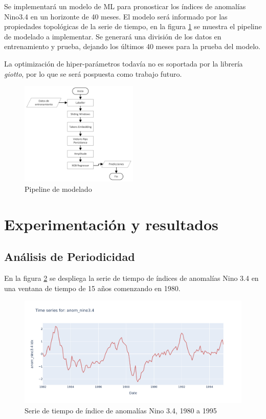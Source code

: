 \documentclass{article}
\begin{document}
            Se implementará un modelo de ML para pronosticar los índices de anomalías Nino3.4 en un horizonte de 40 meses. El modelo será informado por las propiedades topológicas de la serie de tiempo, en la figura \ref{fig:model_pipeline} se muestra el pipeline de modelado a implementar. Se generará una división de los datos en entrenamiento y prueba, dejando los últimos 40 meses para la prueba del modelo.

            La optimización de hiper-parámetros todavía no es soportada por la librería \textit{giotto}, por lo que se será pospuesta como trabajo futuro.
            \begin{figure}[!htbp]
                \centering
                \includegraphics[width=0.5\textwidth]{model_pipeline.png}
                \caption{Pipeline de modelado}
                \label{fig:model_pipeline}
            \end{figure}

    \section{Experimentación y resultados}\label{sec:results}

        \subsection{Análisis de Periodicidad}

            En la figura \ref{fig:anom_nino_34_series} se despliega la serie de tiempo de índices de anomalías Nino 3.4 en una ventana de tiempo de 15 años comenzando en 1980.
            \begin{figure}[!htbp]
                \centering
                \includegraphics[scale=0.2]{anom_nino3.4_time_series.png}
                \caption{Serie de tiempo de índice de anomalías Nino 3.4, 1980 a 1995}
                \label{fig:anom_nino_34_series}
            \end{figure}
\end{document}

